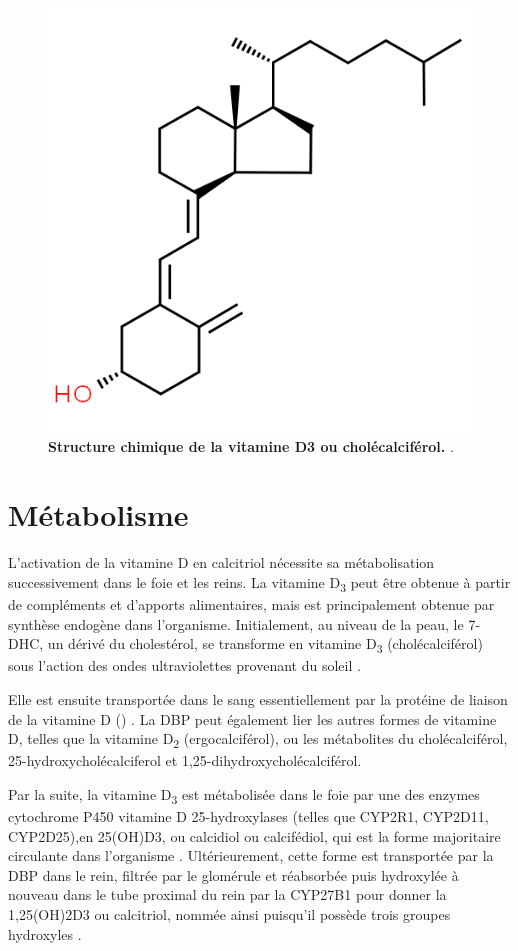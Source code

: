 \documentclass[
  a4paper,
  DIV=11,
  numbers=noendperiod,
  listof=totoc]{scrreprt}
\begin{document}
\begin{figure}
\centering
\includegraphics[width=0.7\columnwidth]{figures/cholecalciferol-chemspider.png} 
\caption[Structure chimique de la vitamine D3 ou cholécalciférol.]{\textbf{Structure chimique de la vitamine D3 ou cholécalciférol.} \textcite{chemspider.2023}.}
\label{fig:vitd3}
\end{figure}

\section{Métabolisme}\label{sec-metabolisme}

L'activation de la vitamine D en calcitriol nécessite sa métabolisation
successivement dans le foie et les reins. La vitamine D\textsubscript{3}
peut être obtenue à partir de compléments et d'apports alimentaires,
mais est principalement obtenue par synthèse endogène dans l'organisme.
Initialement, au niveau de la peau, le \ac{7-DHC}, un dérivé du
cholestérol, se transforme en vitamine D\textsubscript{3}
(cholécalciférol) sous l'action des ondes ultraviolettes provenant du
soleil \autocite{Bikle.2014}.

Elle est ensuite transportée dans le sang essentiellement par la
protéine de liaison de la vitamine D ()
\autocite{Christakos.2010,Chun.2012}. La \ac{DBP} peut également lier
les autres formes de vitamine D, telles que la vitamine
D\textsubscript{2} (ergocalciférol), ou les métabolites du
cholécalciférol, 25-hydroxycholécalciferol et
1,25-dihydroxycholécalciférol.

Par la suite, la vitamine D\textsubscript{3} est métabolisée dans le
foie par une des enzymes cytochrome P450 vitamine D 25-hydroxylases
(telles que CYP2R1, CYP2D11, CYP2D25),en \ac{25(OH)D3}, ou calcidiol ou
calcifédiol, qui est la forme majoritaire circulante dans l'organisme
\autocite{Norman.2008,Christakos.2010}. Ultérieurement, cette forme est
transportée par la \ac{DBP} dans le rein, filtrée par le glomérule et
réabsorbée puis hydroxylée à nouveau dans le tube proximal du rein par
la \ac{CYP27B1} pour donner la \ac{1,25(OH)2D3} ou calcitriol, nommée
ainsi puisqu'il possède trois groupes hydroxyles
\autocite{Norman.2008,Dankers.2017}.
\end{document}
